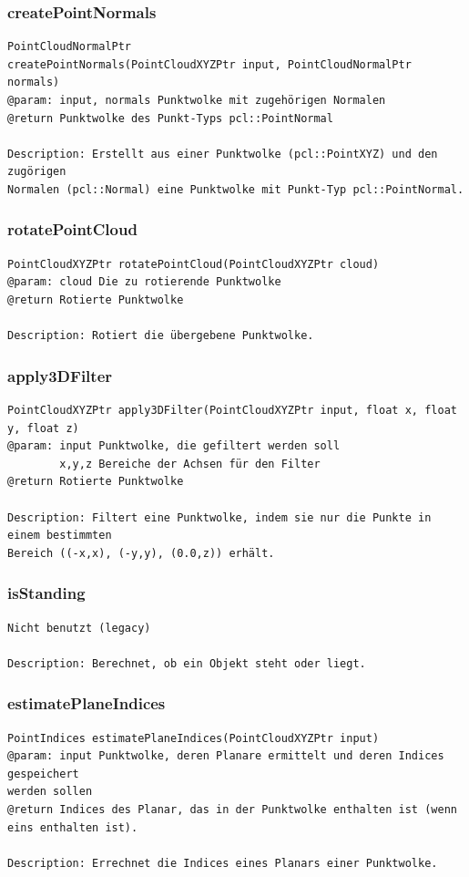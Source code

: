 \documentclass{suturo}
\begin{document}
\subsubsection{createPointNormals}
\begin{verbatim}
PointCloudNormalPtr
createPointNormals(PointCloudXYZPtr input, PointCloudNormalPtr normals)
@param: input, normals Punktwolke mit zugehörigen Normalen
@return Punktwolke des Punkt-Typs pcl::PointNormal

Description: Erstellt aus einer Punktwolke (pcl::PointXYZ) und den zugörigen
Normalen (pcl::Normal) eine Punktwolke mit Punkt-Typ pcl::PointNormal.
\end{verbatim}\label{func:createpointnormals}

\subsubsection{rotatePointCloud}
\begin{verbatim}
PointCloudXYZPtr rotatePointCloud(PointCloudXYZPtr cloud) 
@param: cloud Die zu rotierende Punktwolke
@return Rotierte Punktwolke

Description: Rotiert die übergebene Punktwolke.
\end{verbatim}\label{func:rotatepointcloud}


\subsubsection{apply3DFilter}
\begin{verbatim}
PointCloudXYZPtr apply3DFilter(PointCloudXYZPtr input, float x, float y, float z)
@param: input Punktwolke, die gefiltert werden soll
		x,y,z Bereiche der Achsen für den Filter
@return Rotierte Punktwolke

Description: Filtert eine Punktwolke, indem sie nur die Punkte in einem bestimmten
Bereich ((-x,x), (-y,y), (0.0,z)) erhält.
\end{verbatim}\label{func:apply3dfilter}


\subsubsection{isStanding}
\begin{verbatim}
Nicht benutzt (legacy)

Description: Berechnet, ob ein Objekt steht oder liegt.
\end{verbatim}\label{func:isstanding}

\subsubsection{estimatePlaneIndices}
\begin{verbatim}
PointIndices estimatePlaneIndices(PointCloudXYZPtr input)
@param: input Punktwolke, deren Planare ermittelt und deren Indices gespeichert
werden sollen
@return Indices des Planar, das in der Punktwolke enthalten ist (wenn eins enthalten ist).

Description: Errechnet die Indices eines Planars einer Punktwolke.
\end{verbatim}\label{func:estimateplaneindices}
\end{document}

